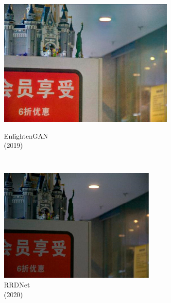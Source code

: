 \documentclass[CJK,aspectratio=169]{beamer}  %
\begin{document}
\begin{frame}
\begin{figure}
\begin{minipage}{.6\columnwidth}
\begin{minipage}{0.18\columnwidth}
				\includegraphics[width=\linewidth]{picture/LLIE/VE-LOL-L/EnlightenGAN}
				\captionsetup{justification=centering}
				\caption*{\tiny EnlightenGAN \\ (2019)}
				\label{fig: EnlightenGAN}	
			\end{minipage}\\
			\vspace{-0.3cm}
			\begin{minipage}{0.18\columnwidth}	
				\includegraphics[width=\linewidth]{picture/LLIE/VE-LOL-L/RRDNet}
				\captionsetup{justification=centering}
				\caption*{\tiny RRDNet \\ (2020)}
				\label{fig: RRDNet}	
			\end{minipage}
			\begin{minipage}{0.18\columnwidth}

\end{minipage}
\end{minipage}
\end{figure}
\end{frame}
\end{document}
